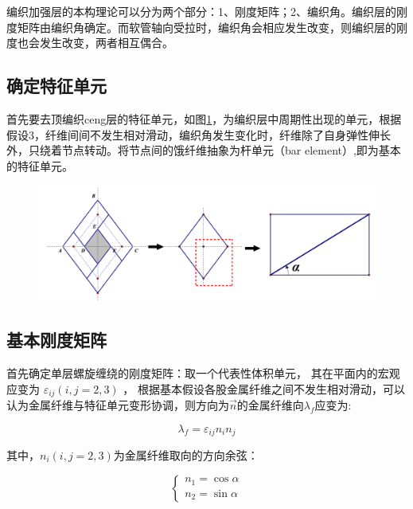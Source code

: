 编织加强层的本构理论可以分为两个部分：1、刚度矩阵；2、编织角。编织层的刚度矩阵由编织角确定。而软管轴向受拉时，编织角会相应发生改变，则编织层的刚度也会发生改变，两者相互偶合。


\subsection{确定特征单元}
首先要去顶编织ceng层的特征单元，如图\ref{fig:unit}，为编织层中周期性出现的单元，根据假设3，纤维间间不发生相对滑动，编织角发生变化时，纤维除了自身弹性伸长外，只绕着节点转动。将节点间的饿纤维抽象为杆单元（bar element）,即为基本的特征单元。
\begin{figure}[!htp]
\centering
\includegraphics[width=0.9\linewidth]{figure/chap3/unit}
\label{fig:unit}
\end{figure}




\subsection{基本刚度矩阵}
首先确定单层螺旋缠绕的刚度矩阵：取一个代表性体积单元，
其在平面内的宏观应变为
$ {\varepsilon _{ij}}\left( {i,j = 2,3} \right)$ ，
根据基本假设各股金属纤维之间不发生相对滑动，可以认为金属纤维与特征单元变形协调，则方向为$  \vec{n} $的金属纤维向$ \lambda_f $应变为\cite{gaosiyang2009}:







\begin{equation}
{\lambda _f} = {\varepsilon _{ij}}{n_i}{n_j}
\end{equation}

其中，$ n_i\left( {i,j = 2,3} \right) $为金属纤维取向的方向余弦：

\begin{equation}
\label{eq:fiber-strain}
\left\{ {\begin{array}{*{20}{c}}
	{{n_1} = \cos \alpha }\\
	{{n_2} = \sin \alpha }
	\end{array}} \right.
\end{equation}

